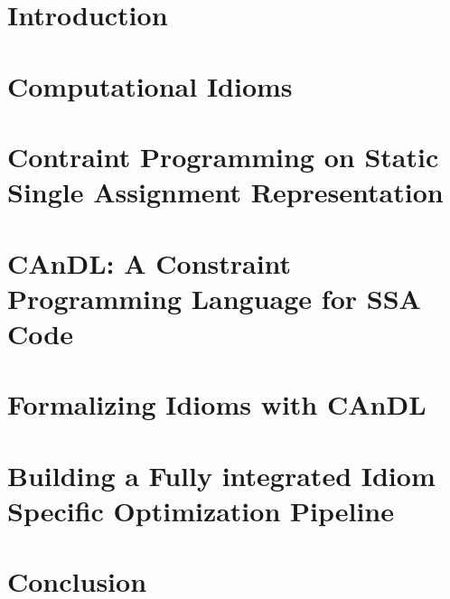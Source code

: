\documentclass[phd,icsa,twoside,logo,11pt]{infthesis}
\begin{document}
\chapter{Introduction}
    

\chapter{Computational Idioms}
    

\chapter{Contraint Programming on Static Single Assignment Representation}
    

\chapter{CAnDL: A Constraint Programming Language for SSA Code}
    

\chapter{Formalizing Idioms with CAnDL}
    

\chapter{Building a Fully integrated Idiom Specific Optimization Pipeline}
    

\chapter{Conclusion}


\end{document}
